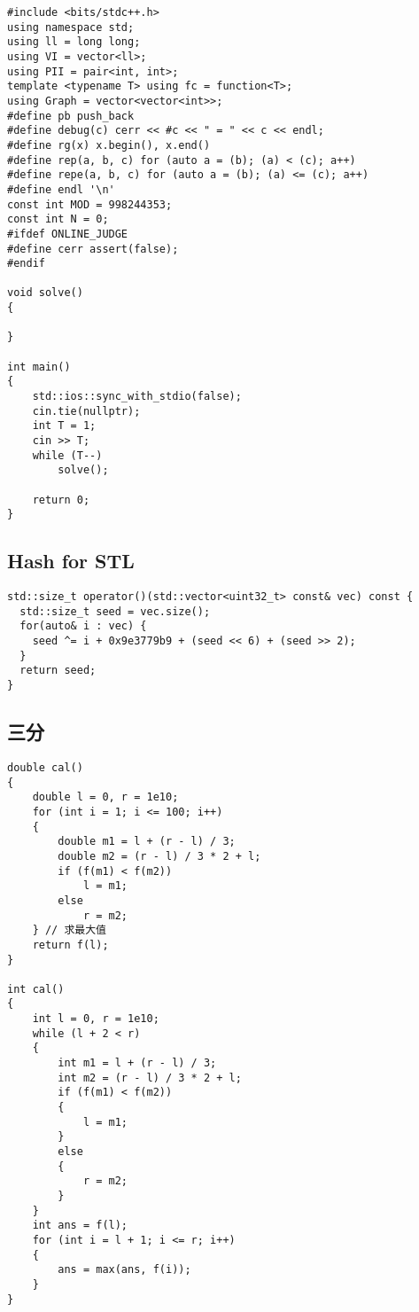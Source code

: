 \documentclass[]{article}
\begin{document}
\begin{verbatim}
#include <bits/stdc++.h>
using namespace std;
using ll = long long;
using VI = vector<ll>;
using PII = pair<int, int>;
template <typename T> using fc = function<T>;
using Graph = vector<vector<int>>;
#define pb push_back
#define debug(c) cerr << #c << " = " << c << endl;
#define rg(x) x.begin(), x.end()
#define rep(a, b, c) for (auto a = (b); (a) < (c); a++)
#define repe(a, b, c) for (auto a = (b); (a) <= (c); a++)
#define endl '\n'
const int MOD = 998244353;
const int N = 0;
#ifdef ONLINE_JUDGE
#define cerr assert(false);
#endif

void solve()
{
    
}

int main()
{
    std::ios::sync_with_stdio(false);
    cin.tie(nullptr);
    int T = 1;
    cin >> T;
    while (T--)
        solve();

    return 0;
}
\end{verbatim}

\hypertarget{hash-for-stl}{%
\subsection{Hash for STL}\label{hash-for-stl}}

\begin{verbatim}
std::size_t operator()(std::vector<uint32_t> const& vec) const {
  std::size_t seed = vec.size();
  for(auto& i : vec) {
    seed ^= i + 0x9e3779b9 + (seed << 6) + (seed >> 2);
  }
  return seed;
}
\end{verbatim}

\hypertarget{ux4e09ux5206}{%
\subsection{三分}\label{ux4e09ux5206}}

\begin{verbatim}
double cal()
{
    double l = 0, r = 1e10;
    for (int i = 1; i <= 100; i++)
    {
        double m1 = l + (r - l) / 3;
        double m2 = (r - l) / 3 * 2 + l;
        if (f(m1) < f(m2))
            l = m1;
        else
            r = m2;
    } // 求最大值
    return f(l);
}

int cal()
{
    int l = 0, r = 1e10;
    while (l + 2 < r)
    {
        int m1 = l + (r - l) / 3;
        int m2 = (r - l) / 3 * 2 + l;
        if (f(m1) < f(m2))
        {
            l = m1;
        }
        else
        {
            r = m2;
        }
    }
    int ans = f(l);
    for (int i = l + 1; i <= r; i++)
    {
        ans = max(ans, f(i));
    }
}
\end{verbatim}
\end{document}
